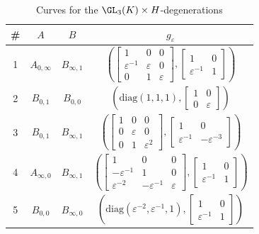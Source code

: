 \documentclass[12pt]{amsart}
\newcommand{\field}{K}
\newcommand{\diag}{\mathrm{diag}}
\begin{document}
\begin{table}[ht]
\centering
\small
\caption{Curves for the $\GL_3(\field)\times H$-degenerations}
\label{table:GL3xH-degenerations}
\centering
{\renewcommand{\arraystretch}{1.3}
\setlength{\tabcolsep}{8pt}
\begin{tabular}{|c||c||c||c|}
\hline
\textbf{\#} & $A$ & $B$ & $g_\varepsilon$ \\
\hline\hline
1 & $A_{0, \infty}$ & $B_{\infty,1}$ & $\left(\begin{bmatrix}1&0&0\\ \varepsilon^{-1}&\varepsilon&0\\0&1&\varepsilon\end{bmatrix}, 
\begin{bmatrix}1&0\\ \varepsilon^{-1}&1\end{bmatrix}\right)$ 
\\
\hline
2 & $B_{0, 1}$ & $B_{0,0}$ & $\left(\diag(1, 1, 1), 
\begin{bmatrix}1&0\\ 0&\varepsilon\end{bmatrix}\right)$
\\
\hline
3 & $B_{0,1}$ & $B_{\infty,1}$ & 
$\left(\begin{bmatrix}1&0&0\\0& \varepsilon&0 \\0&1&\varepsilon^2\end{bmatrix},
\begin{bmatrix} 1&0\\ \varepsilon^{-1}&-\varepsilon^{-3}\end{bmatrix}\right)$\\ 
\hline
4 & $A_{\infty, 0}$ & $B_{\infty,1}$ & 
$\left(\begin{bmatrix}1&0&0\\-\varepsilon^{-1}&1&0 \\\varepsilon^{-2}&-\varepsilon^{-1}&\varepsilon\end{bmatrix},
\begin{bmatrix} 1&0\\ \varepsilon^{-1}&1 \end{bmatrix}\right)$\\ 
\hline
5 & $B_{0,0}$ & $B_{\infty,0}$ & 
$\left(\diag(\varepsilon^{-2}, \varepsilon^{-1}, 1),
\begin{bmatrix} 1&0\\ \varepsilon^{-1}&1 \end{bmatrix}\right)$\\ 
\hline


\end{tabular}}
\end{table}
\end{document}
